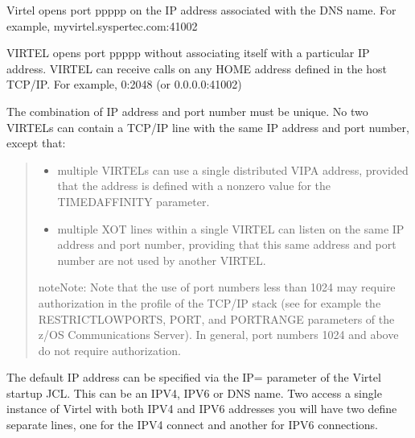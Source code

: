 \documentclass[letterpaper,10pt,english]{sphinxmanual}
\begin{document}
\begin{description}
\begin{description}
\sphinxAtStartPar
Virtel opens port ppppp on the IP address associated with the DNS name. For example, myvirtel.syspertec.com:41002

\sphinxAtStartPar
VIRTEL opens port ppppp without associating itself with a particular
IP address. VIRTEL can receive calls on any HOME address defined in
the host TCP/IP. For example, 0:2048 (or 0.0.0.0:41002)

\end{description}

\sphinxAtStartPar
The combination of IP address and port number must be unique. No two VIRTELs can contain a TCP/IP line with the same IP address and port number, except that:
\begin{quote}
\begin{itemize}
\item {} 
\sphinxAtStartPar
multiple VIRTELs can use a single distributed VIPA address, provided that the address is defined with a non\sphinxhyphen{}zero value for the TIMEDAFFINITY parameter.

\item {} 
\sphinxAtStartPar
multiple XOT lines within a single VIRTEL can listen on the same IP address and port number, providing that this same address and port number are not used by another VIRTEL.

\end{itemize}

\begin{sphinxadmonition}{note}{Note:}
\sphinxAtStartPar
Note that the use of port numbers less than 1024 may require authorization in the profile of the TCP/IP stack (see for example the RESTRICTLOWPORTS, PORT, and PORTRANGE parameters of the z/OS Communications Server). In general, port numbers 1024 and above do not require authorization.
\end{sphinxadmonition}
\end{quote}

\sphinxAtStartPar
The default IP address can be specified via the IP= parameter of the Virtel startup JCL. This can be an IPV4, IPV6 or DNS name. Two access a single instance of Virtel with both IPV4 and IPV6 addresses you will have two define separate lines, one for the IPV4 connect and another for IPV6 connections.


\end{description}
\end{document}
